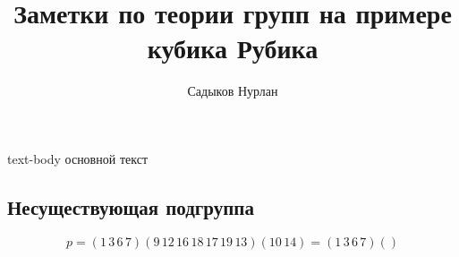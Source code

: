 \documentclass{tufte-book}
\title{Заметки по теории групп {\Huge на примере кубика Рубика}} %
\author{Садыков Нурлан}
\begin{document}
\frontmatter

\maketitle  

text-body
основной текст

\subsection{Несуществующая подгруппа}
$$ p = (1\,3\,6\,7) (9\,12\,16\,18\,17\,19\,13) (10\,14)
= (1\,3\,6\,7) ()
$$
\end{document}
